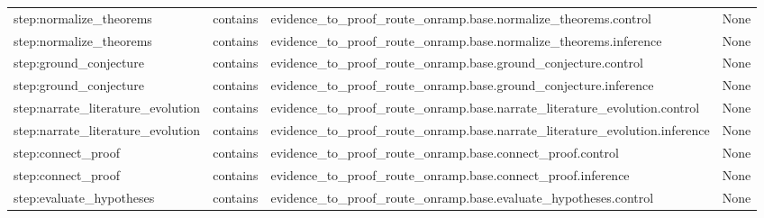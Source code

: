 \documentclass[10pt,a4paper]{article}
\begin{document}
\begin{longtable}{@{}>{\raggedright\arraybackslash}p{.24\linewidth}>{\raggedright\arraybackslash}p{.12\linewidth}>{\raggedright\arraybackslash}p{.24\linewidth}>{\raggedright\arraybackslash}p{.20\linewidth}@{}}
step:\allowbreak{}normalize\_\allowbreak{}theorems & contains & evidence\_\allowbreak{}to\_\allowbreak{}proof\_\allowbreak{}route\_\allowbreak{}onramp.\allowbreak{}base.\allowbreak{}normalize\_\allowbreak{}theorems.\allowbreak{}control & None\\
step:\allowbreak{}normalize\_\allowbreak{}theorems & contains & evidence\_\allowbreak{}to\_\allowbreak{}proof\_\allowbreak{}route\_\allowbreak{}onramp.\allowbreak{}base.\allowbreak{}normalize\_\allowbreak{}theorems.\allowbreak{}inference & None\\
step:\allowbreak{}ground\_\allowbreak{}conjecture\allowbreak{} & contains & evidence\_\allowbreak{}to\_\allowbreak{}proof\_\allowbreak{}route\_\allowbreak{}onramp.\allowbreak{}base.\allowbreak{}ground\_\allowbreak{}conjecture\allowbreak{}.\allowbreak{}control & None\\
step:\allowbreak{}ground\_\allowbreak{}conjecture\allowbreak{} & contains & evidence\_\allowbreak{}to\_\allowbreak{}proof\_\allowbreak{}route\_\allowbreak{}onramp.\allowbreak{}base.\allowbreak{}ground\_\allowbreak{}conjecture\allowbreak{}.\allowbreak{}inference & None\\
step:\allowbreak{}narrate\_\allowbreak{}literature\allowbreak{}\_\allowbreak{}evolution & contains & evidence\_\allowbreak{}to\_\allowbreak{}proof\_\allowbreak{}route\_\allowbreak{}onramp.\allowbreak{}base.\allowbreak{}narrate\_\allowbreak{}literature\allowbreak{}\_\allowbreak{}evolution.\allowbreak{}control & None\\
step:\allowbreak{}narrate\_\allowbreak{}literature\allowbreak{}\_\allowbreak{}evolution & contains & evidence\_\allowbreak{}to\_\allowbreak{}proof\_\allowbreak{}route\_\allowbreak{}onramp.\allowbreak{}base.\allowbreak{}narrate\_\allowbreak{}literature\allowbreak{}\_\allowbreak{}evolution.\allowbreak{}inference & None\\
step:\allowbreak{}connect\_\allowbreak{}proof & contains & evidence\_\allowbreak{}to\_\allowbreak{}proof\_\allowbreak{}route\_\allowbreak{}onramp.\allowbreak{}base.\allowbreak{}connect\_\allowbreak{}proof.\allowbreak{}control & None\\
step:\allowbreak{}connect\_\allowbreak{}proof & contains & evidence\_\allowbreak{}to\_\allowbreak{}proof\_\allowbreak{}route\_\allowbreak{}onramp.\allowbreak{}base.\allowbreak{}connect\_\allowbreak{}proof.\allowbreak{}inference & None\\
step:\allowbreak{}evaluate\_\allowbreak{}hypotheses\allowbreak{} & contains & evidence\_\allowbreak{}to\_\allowbreak{}proof\_\allowbreak{}route\_\allowbreak{}onramp.\allowbreak{}base.\allowbreak{}evaluate\_\allowbreak{}hypotheses\allowbreak{}.\allowbreak{}control & None\\

\end{longtable}
\end{document}

